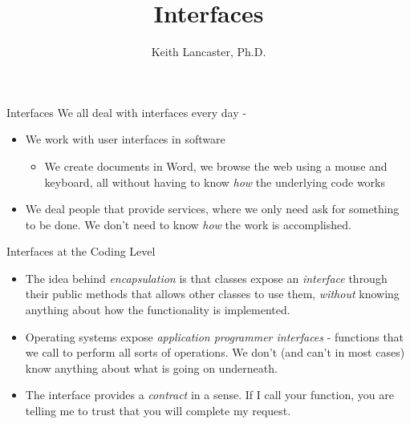 \documentclass[10pt,xcolor={table,dvipsnames},t]{beamer}
\title[Your Short Title]{Interfaces}
\author{Keith Lancaster, Ph.D.}
\institute{Department of Computer Science and Engineering}
\date{}
\begin{document}
\begin{frame}
  \titlepage
\end{frame}


\section{}

\begin{frame}[c]{Interfaces}
\large
We all deal with interfaces every day - 
\begin{itemize}
	\item We work with user interfaces in software
	\large
	\begin{itemize}
	    \item We create documents in Word, we browse the web using a mouse and keyboard, all without having to know \textit{how} the underlying code works
    \end{itemize}   
    \item We deal people that provide services, where we only need ask for something to be done. We don't need to know \textit{how} the work is accomplished.

\end{itemize}
\end{frame}

\begin{frame}[c]{Interfaces at the Coding Level}
\large
\begin{itemize}

\item The idea behind \textit{encapsulation} is that classes expose an \textit{interface}
through their public methods that allows other classes to use them, \textit{without}
knowing anything about how the functionality is implemented.

\item Operating systems expose \textit{application programmer interfaces} - functions that we call to perform all sorts of operations. We don't (and can't in most cases) know anything about what is going on underneath. 

\item The interface provides a \textit{contract} in a sense. If I call your function, you are telling me to trust that you will complete my request.
\end{itemize}
\end{frame}
\end{document}
